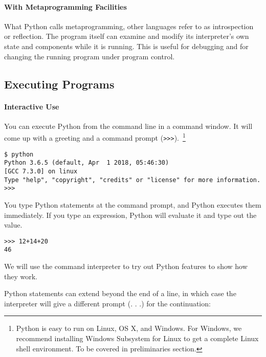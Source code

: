 \paragraph{With Metaprogramming Facilities}
What Python calls metaprogramming,
other languages refer to as introspection or reflection. The program
itself can examine and modify its interpreter's own state and components
while it is running. This is useful for debugging and for changing the
running program under program control.

\subsection{Executing Programs}
\label{executing-programs}

\paragraph{Interactive Use}
\label{interactive-use}
You can execute Python from the
command line in a command window. It will come up with a greeting and a
command prompt (\verb">>>").~\footnote{Python is easy to run on Linux, OS X, and Windows. For Windows, we recommend installing Windows Subsystem for Linux to get a complete Linux shell environment. To be covered in preliminaries section.}


\begin{verbatim}
$ python
Python 3.6.5 (default, Apr  1 2018, 05:46:30) 
[GCC 7.3.0] on linux
Type "help", "copyright", "credits" or "license" for more information.
>>> 
\end{verbatim}

You type Python statements at the
command prompt, and Python executes them immediately. If you type an
expression, Python will evaluate it and type out the value.

\begin{verbatim}
>>> 12+14+20
46
\end{verbatim}

We will use the command interpreter
to try out Python features to show how they work.

Python statements can extend beyond
the end of a line, in which case the interpreter will give a different
prompt (. . .) for the continuation:

